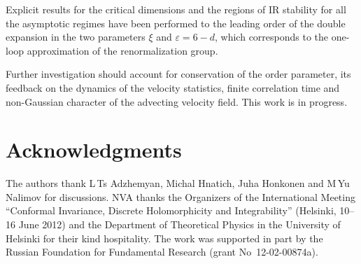 \documentclass[12pt]{iopart}
\begin{document}
Explicit results for the critical dimensions and the regions of IR stability
for all the asymptotic regimes have been performed to the leading order of
the double expansion in the two parameters $\xi$ and $\varepsilon=6-d$, which
corresponds to the one-loop approximation of the renormalization group.


Further investigation should account for conservation of the order parameter,
its feedback on the dynamics of the velocity statistics, finite correlation
time and non-Gaussian character of the advecting velocity field.
 This work is in progress.


\section*{Acknowledgments}
The authors thank L\,Ts Adzhemyan, Michal Hnatich, Juha Honkonen and
M\,Yu Nalimov for discussions.
NVA thanks the Organizers of the International Meeting
``Conformal Invariance, Discrete Holomorphicity and Integrability''
(Helsinki, 10--16 June 2012) and the Department of Theoretical Physics
in the University of Helsinki for their kind hospitality.
The work was supported in part by the Russian Foundation for Fundamental
Research (grant No~12-02-00874a).
\end{document}
